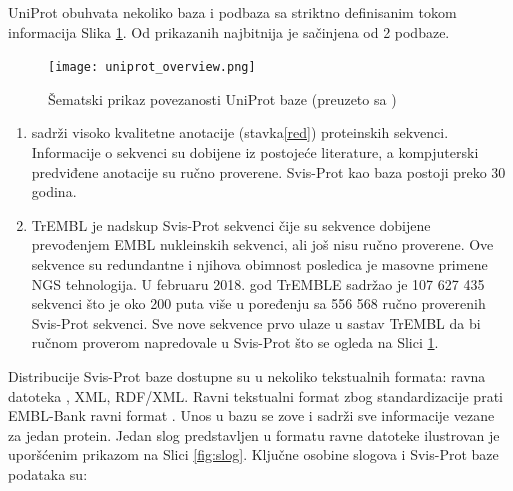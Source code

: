UniProt obuhvata nekoliko baza i podbaza sa striktno definisanim tokom
informacija Slika \ref{fig:uniprot_overview}. Od prikazanih najbitnija je
  sačinjena od 2 podbaze.

\begin{figure}[h!]
  \centering
  \texttt{[image: uniprot\_overview.png]}
  \caption{Šematski prikaz povezanosti UniProt baze (preuzeto sa \cite{www_svisprot})}
  \label{fig:uniprot_overview}
\end{figure}

\begin{enumerate}
  \item {}  sadrži visoko kvalitetne anotacije
     (stavka\ref{red}) proteinskih sekvenci.
    Informacije o sekvenci su dobijene iz postojeće literature, a kompjuterski
    predviđene anotacije su ručno proverene. Svis-Prot kao baza postoji preko
    30 godina.

  \item TrEMBL  je nadskup Svis-Prot sekvenci čije su
    sekvence dobijene prevođenjem EMBL nukleinskih sekvenci, ali još nisu ručno
    proverene. Ove sekvence su redundantne i njihova obimnost posledica je
    masovne primene NGS tehnologija. U februaru 2018. god TrEMBLE sadržao je
    107 627 435 sekvenci što je oko 200 puta više u poređenju sa 556 568 ručno
    proverenih Svis-Prot sekvenci. Sve nove sekvence prvo ulaze u sastav TrEMBL
    da bi ručnom proverom napredovale u Svis-Prot što se ogleda na Slici
    \ref{fig:uniprot_overview}.
\end{enumerate}





Distribucije Svis-Prot baze dostupne su u nekoliko tekstualnih formata: ravna
datoteka , XML, RDF/XML.  Ravni tekstualni format zbog
standardizacije prati EMBL-Bank\parencite{embl} ravni format
\parencite{svisprot2003}. Unos u bazu se zove   i
sadrži sve informacije vezane za jedan protein.  Jedan slog predstavljen u
formatu ravne datoteke ilustrovan je uporšćenim prikazom  na Slici \ref{fig:slog}.
Ključne osobine slogova i Svis-Prot baze podataka su:

